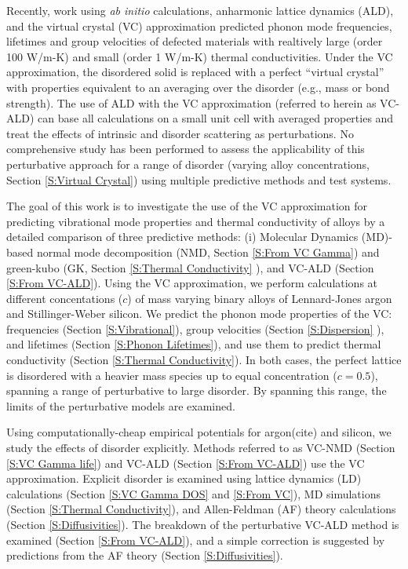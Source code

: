\documentclass[aps,prb,twocolumn,superscriptaddress,amsmath,amssymb,floatfix]{revtex4}
\begin{document}
Recently, work using \emph{ab initio} calculations, anharmonic 
lattice dynamics (ALD), and the virtual crystal (VC) 
approximation predicted phonon mode frequencies, lifetimes and 
group velocities of defected materials with realtively
large (order 100 W/m-K\cite{garg_role_2011,lindsay_thermal_2012}) 
and 
small (order 1 W/m-K\cite{tian_phonon_2012}) 
thermal conductivities. 
Under the VC approximation, the disordered 
solid is replaced with a perfect “virtual crystal” with properties 
equivalent to an averaging over the disorder (e.g., mass or bond 
strength).\cite{abeles_lattice_1963}
The use of ALD with the VC approximation 
(referred to herein as VC-ALD) can base  
all calculations on a small unit cell with averaged properties and 
treat the effects of intrinsic and disorder scattering as perturbations.
\cite{abeles_lattice_1963,tamura_isotope_1983,
tian_phonon_2012,lindsay_thermal_2012} 
No comprehensive study has been performed 
to assess the applicability of this perturbative approach for a range 
of disorder (varying alloy concentrations, Section 
\ref{S:Virtual Crystal}) 
using multiple predictive methods and test systems.

The goal of this work is to investigate the use of the VC 
approximation for predicting vibrational mode properties and 
thermal conductivity of alloys by a detailed comparison 
of three predictive methods: (i) Molecular Dynamics (MD)-based 
normal mode 
decomposition (NMD, Section \ref{S:From VC Gamma}) 
and green-kubo (GK, Section \ref{S:Thermal Conductivity} ), 
and VC-ALD (Section \ref{S:From VC-ALD}). 
Using the VC approximation, 
we perform calculations at different concentations ($c$) 
of mass varying binary alloys of Lennard-Jones 
argon and Stillinger-Weber silicon. We predict 
the phonon mode properties of the VC:  
frequencies (Section \ref{S:Vibrational}), 
group velocities (Section \ref{S:Dispersion} ),  
and lifetimes (Section \ref{S:Phonon Lifetimes}), 
and use them to predict thermal
conductivity (Section \ref{S:Thermal Conductivity}). 
In both cases, the perfect lattice is 
disordered with a heavier mass species up to equal 
concentration ($c=0.5$), spanning 
a range of perturbative to large disorder. By spanning this range, 
the limits of the perturbative models are examined. 

Using computationally-cheap empirical potentials for argon(cite)  
and silicon\cite{stillinger_computer_1985},  
we study the effects of disorder explicitly. 
Methods referred to as VC-NMD (Section \ref{S:VC Gamma life})
and VC-ALD (Section \ref{S:From VC-ALD}) 
use the VC approximation. Explicit disorder 
is examined using lattice dynamics (LD) calculations 
(Section \ref{S:VC Gamma DOS} and \ref{S:From VC}), MD simulations 
(Section \ref{S:Thermal Conductivity}), 
and Allen-Feldman (AF) theory calculations  
(Section \ref{S:Diffusivities}).\cite{allen_thermal_1993} 
The breakdown of the perturbative VC-ALD method is examined 
(Section \ref{S:From VC-ALD}), 
and a simple correction is suggested by predictions from 
the AF theory (Section \ref{S:Diffusivities}).
\end{document}
